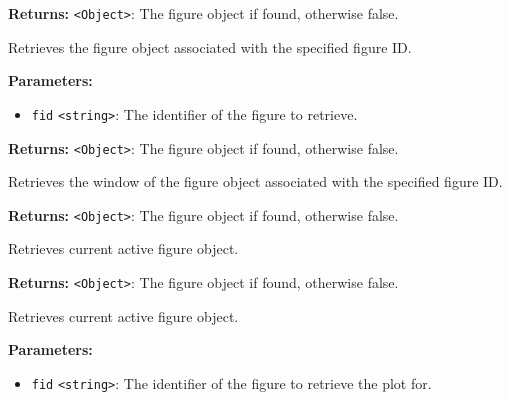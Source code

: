 \documentclass[12pt,a4paper]{article}
\begin{document}
\noindent \textbf{Returns:} \texttt{<Object>}: The figure object if found, otherwise \textasciigrave{}false\textasciigrave{}.

\noindent Retrieves the figure object associated with the specified figure ID.

\vspace{5mm}
\noindent {}


\noindent \textbf{Parameters:}
\begin{itemize}
  \item \texttt{fid} \texttt{<string>}: The identifier of the figure to retrieve.
\end{itemize}

\noindent \textbf{Returns:} \texttt{<Object>}: The figure object if found, otherwise \textasciigrave{}false\textasciigrave{}.

\noindent Retrieves the window of the figure object associated with the specified figure ID.

\vspace{5mm}
\noindent {}


\noindent \textbf{Returns:} \texttt{<Object>}: The figure object if found, otherwise \textasciigrave{}false\textasciigrave{}.

\noindent Retrieves current active figure object.

\vspace{5mm}
\noindent {}


\noindent \textbf{Returns:} \texttt{<Object>}: The figure object if found, otherwise \textasciigrave{}false\textasciigrave{}.

\noindent Retrieves current active figure object.

\vspace{5mm}
\noindent {}


\noindent \textbf{Parameters:}
\begin{itemize}
  \item \texttt{fid} \texttt{<string>}: The identifier of the figure to retrieve the plot for.
\end{itemize}
\end{document}
